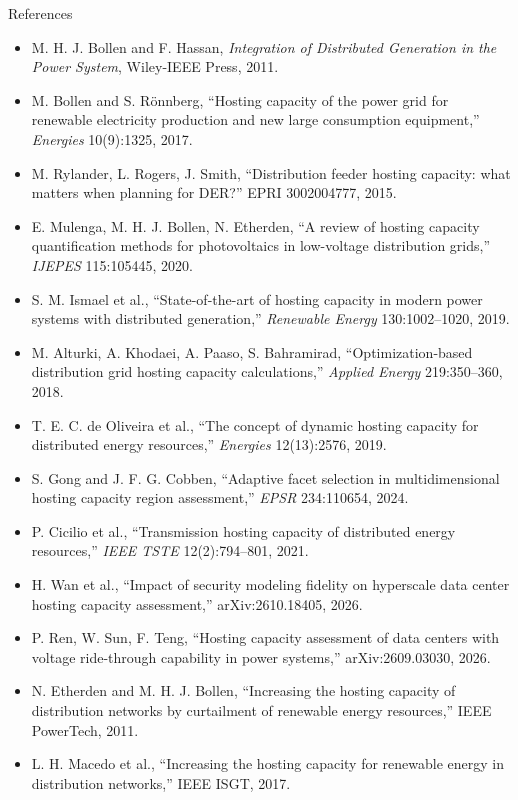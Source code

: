 \documentclass[aspectratio=169,11pt]{beamer}
\begin{document}
\begin{frame}[allowframebreaks]{References}
  \scriptsize
  \begin{itemize}
    \item M. H. J. Bollen and F. Hassan, \emph{Integration of Distributed Generation in the Power System}, Wiley-IEEE Press, 2011.
    \item M. Bollen and S. R\"onnberg, ``Hosting capacity of the power grid for renewable electricity production and new large consumption equipment,'' \emph{Energies} 10(9):1325, 2017.
    \item M. Rylander, L. Rogers, J. Smith, ``Distribution feeder hosting capacity: what matters when planning for DER?'' EPRI 3002004777, 2015.
    \item E. Mulenga, M. H. J. Bollen, N. Etherden, ``A review of hosting capacity quantification methods for photovoltaics in low-voltage distribution grids,'' \emph{IJEPES} 115:105445, 2020.
    \item S. M. Ismael et al., ``State-of-the-art of hosting capacity in modern power systems with distributed generation,'' \emph{Renewable Energy} 130:1002--1020, 2019.
    \item M. Alturki, A. Khodaei, A. Paaso, S. Bahramirad, ``Optimization-based distribution grid hosting capacity calculations,'' \emph{Applied Energy} 219:350--360, 2018.
    \item T. E. C. de Oliveira et al., ``The concept of dynamic hosting capacity for distributed energy resources,'' \emph{Energies} 12(13):2576, 2019.
    \item S. Gong and J. F. G. Cobben, ``Adaptive facet selection in multidimensional hosting capacity region assessment,'' \emph{EPSR} 234:110654, 2024.
    \item P. Cicilio et al., ``Transmission hosting capacity of distributed energy resources,'' \emph{IEEE TSTE} 12(2):794--801, 2021.
    \item H. Wan et al., ``Impact of security modeling fidelity on hyperscale data center hosting capacity assessment,'' arXiv:2610.18405, 2026.
    \item P. Ren, W. Sun, F. Teng, ``Hosting capacity assessment of data centers with voltage ride-through capability in power systems,'' arXiv:2609.03030, 2026.
    \item N. Etherden and M. H. J. Bollen, ``Increasing the hosting capacity of distribution networks by curtailment of renewable energy resources,'' IEEE PowerTech, 2011.
    \item L. H. Macedo et al., ``Increasing the hosting capacity for renewable energy in distribution networks,'' IEEE ISGT, 2017.

\end{itemize}
\end{frame}
\end{document}

